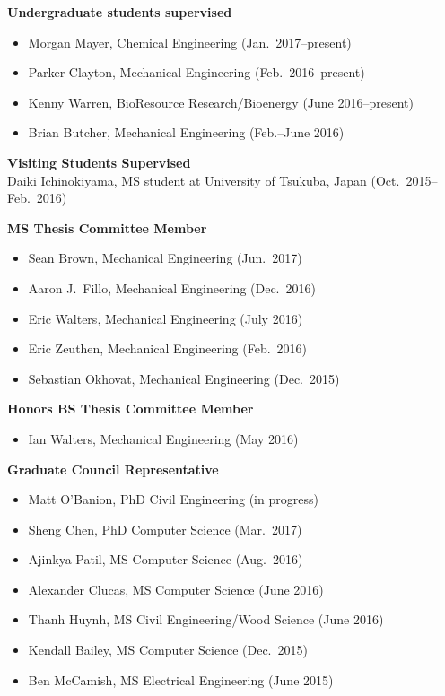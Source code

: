 \documentclass[margin,line,11pt]{res}
\begin{document}
\begin{resume}
\textbf{Undergraduate students supervised}
\begin{itemize}[leftmargin=*]
    \item Morgan Mayer, Chemical Engineering (Jan.~2017--present)
    \item Parker Clayton, Mechanical Engineering (Feb.~2016--present)
    \item Kenny Warren, BioResource Research\slash Bioenergy (June 2016--present)
    \item Brian Butcher, Mechanical Engineering (Feb.--June 2016)
\end{itemize}

\textbf{Visiting Students Supervised} \\
Daiki Ichinokiyama, MS student at University of Tsukuba, Japan (Oct.~2015--Feb.~2016)


\textbf{MS Thesis Committee Member}
\begin{itemize}[leftmargin=*]
    \item Sean Brown, Mechanical Engineering (Jun.~2017)
    \item Aaron J.~Fillo, Mechanical Engineering (Dec.~2016)
    \item Eric Walters, Mechanical Engineering (July 2016)
    \item Eric Zeuthen, Mechanical Engineering (Feb.~2016)
    \item Sebastian Okhovat, Mechanical Engineering (Dec.~2015)
\end{itemize}

\textbf{Honors BS Thesis Committee Member}
\begin{itemize}[leftmargin=*]
    \item Ian Walters, Mechanical Engineering (May 2016)
\end{itemize}

\textbf{Graduate Council Representative}
\begin{itemize}[leftmargin=*]
    \item Matt O'Banion, PhD Civil Engineering (in progress)
    \item Sheng Chen, PhD Computer Science (Mar.~2017)
    \item Ajinkya Patil, MS Computer Science (Aug.~2016)
    \item Alexander Clucas, MS Computer Science (June 2016)
    \item Thanh Huynh, MS Civil Engineering\slash Wood Science (June 2016)
    \item Kendall Bailey, MS Computer Science (Dec.~2015)
    \item Ben McCamish, MS Electrical Engineering (June 2015)
\end{itemize}


\end{resume}
\end{document}
